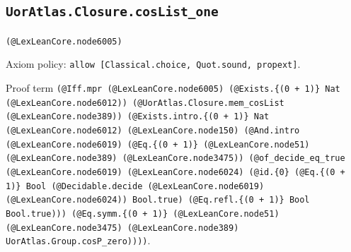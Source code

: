 \documentclass[11pt]{article}
\begin{document}
\subsection*{\texttt{UorAtlas.Closure.cosList\_one}}
\noindent\texttt{(@LexLeanCore.node6005)}\par
\noindent Axiom policy: \texttt{allow [Classical.choice, Quot.sound, propext]}.\par
\noindent Proof term \texttt{(@Iff.mpr (@LexLeanCore.node6005) (@Exists.\{(0 + 1)\} Nat (@LexLeanCore.node6012)) (@UorAtlas.Closure.mem\_cosList (@LexLeanCore.node389)) (@Exists.intro.\{(0 + 1)\} Nat (@LexLeanCore.node6012) (@LexLeanCore.node150) (@And.intro (@LexLeanCore.node6019) (@Eq.\{(0 + 1)\} (@LexLeanCore.node51) (@LexLeanCore.node389) (@LexLeanCore.node3475)) (@of\_decide\_eq\_true (@LexLeanCore.node6019) (@LexLeanCore.node6024) (@id.\{0\} (@Eq.\{(0 + 1)\} Bool (@Decidable.decide (@LexLeanCore.node6019) (@LexLeanCore.node6024)) Bool.true) (@Eq.refl.\{(0 + 1)\} Bool Bool.true))) (@Eq.symm.\{(0 + 1)\} (@LexLeanCore.node51) (@LexLeanCore.node3475) (@LexLeanCore.node389) UorAtlas.Group.cosP\_zero))))}.\par
\end{document}
